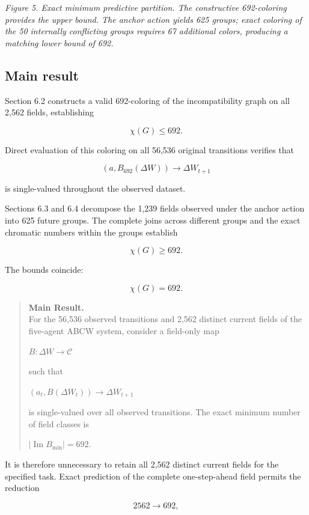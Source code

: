 \documentclass[
  11pt,
]{article}
\begin{document}
\emph{Figure 5. Exact minimum predictive partition. The constructive
692-coloring provides the upper bound. The anchor action yields 625
groups; exact coloring of the 50 internally conflicting groups requires
67 additional colors, producing a matching lower bound of 692.}

\hypertarget{main-result}{%
\subsection{Main result}\label{main-result}}

Section 6.2 constructs a valid 692-coloring of the incompatibility graph
on all 2,562 fields, establishing

\[{\chi(G)\le692.}\]

Direct evaluation of this coloring on all 56,536 original transitions
verifies that

\[{(a,B_{692}(\Delta W))\longrightarrow\Delta W_{t+1}}\]

is single-valued throughout the observed dataset.

Sections 6.3 and 6.4 decompose the 1,239 fields observed under the
anchor action into 625 future groups. The complete joins across
different groups and the exact chromatic numbers within the groups
establish

\[{\chi(G)\ge692.}\]

The bounds coincide:

\[{\boxed{\chi(G)=692}.}\]

\begin{quote}
\textbf{Main Result.}\\
For the 56,536 observed transitions and 2,562 distinct current fields of
the five-agent ABCW system, consider a field-only map

\({B:\Delta W\longrightarrow\mathcal C}\)

such that

\({(a_t,B(\Delta W_t))\longrightarrow\Delta W_{t+1}}\)

is single-valued over all observed transitions. The exact minimum number
of field classes is

\({\boxed{|\operatorname{Im}B_{\min}|=692}.}\)
\end{quote}

It is therefore unnecessary to retain all 2,562 distinct current fields
for the specified task. Exact prediction of the complete one-step-ahead
field permits the reduction

\[{2562\longrightarrow692,}\]
\end{document}
